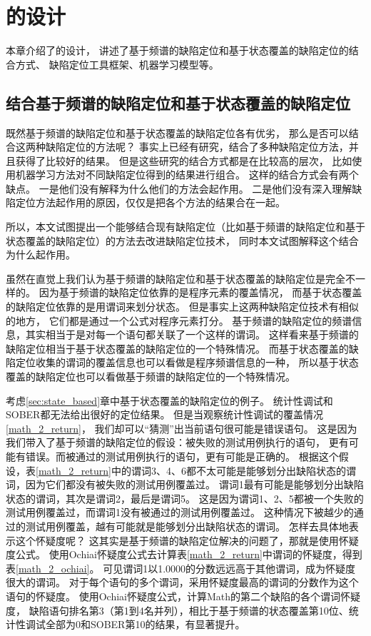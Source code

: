 \chapter{\toolname{}的设计}

本章介绍了\toolname{}的设计，
讲述了基于频谱的缺陷定位和基于状态覆盖的缺陷定位的结合方式、
缺陷定位工具框架、机器学习模型等。

\section{结合基于频谱的缺陷定位和基于状态覆盖的缺陷定位}
\label{sec:approach_comb}

既然基于频谱的缺陷定位和基于状态覆盖的缺陷定位各有优劣，
那么是否可以结合这两种缺陷定位的方法呢？
事实上已经有研究\parencite{Le2016A,Xuan2014Learning}，结合了多种缺陷定位方法，并且获得了比较好的结果。
但是这些研究的结合方式都是在比较高的层次，
比如使用机器学习方法对不同缺陷定位得到的结果进行组合。
这样的结合方式会有两个缺点。
一是他们没有解释为什么他们的方法会起作用。
二是他们没有深入理解缺陷定位方法起作用的原因，仅仅是把各个方法的结果合在一起。

所以，本文试图提出一个能够结合现有缺陷定位（比如基于频谱的缺陷定位和基于状态覆盖的缺陷定位）的方法去改进缺陷定位技术，
同时本文试图解释这个结合为什么起作用。

虽然在直觉上我们认为基于频谱的缺陷定位和基于状态覆盖的缺陷定位是完全不一样的。
因为基于频谱的缺陷定位依靠的是程序元素的覆盖情况，
而基于状态覆盖的缺陷定位依靠的是用谓词来划分状态。
但是事实上这两种缺陷定位技术有相似的地方，
它们都是通过一个公式对程序元素打分。
基于频谱的缺陷定位的频谱信息，其实相当于是对每一个语句都关联了一个这样的谓词。
这样看来基于频谱的缺陷定位相当于基于状态覆盖的缺陷定位的一个特殊情况。
而基于状态覆盖的缺陷定位收集的谓词的覆盖信息也可以看做是程序频谱信息的一种，
所以基于状态覆盖的缺陷定位也可以看做基于频谱的缺陷定位的一个特殊情况。

考虑\ref{sec:state_based}章中基于状态覆盖的缺陷定位的例子。
统计性调试和SOBER都无法给出很好的定位结果。
但是当观察统计性调试的覆盖情况\ref{math_2_return}，
我们却可以“猜测”出当前语句很可能是错误语句。
这是因为我们带入了基于频谱的缺陷定位的假设：被失败的测试用例执行的语句，
更有可能有错误。而被通过的测试用例执行的语句，更有可能是正确的。
根据这个假设，表\ref{math_2_return}中的谓词3、4、6都不太可能是能够划分出缺陷状态的谓词，因为它们都没有被失败的测试用例覆盖过。
谓词1最有可能是能够划分出缺陷状态的谓词，其次是谓词2，最后是谓词5。
这是因为谓词1、2、5都被一个失败的测试用例覆盖过，而谓词1没有被通过的测试用例覆盖过。
这种情况下被越少的通过的测试用例覆盖，越有可能就是能够划分出缺陷状态的谓词。
怎样去具体地表示这个怀疑度呢？
这其实是基于频谱的缺陷定位解决的问题了，那就是使用怀疑度公式。
使用Ochiai怀疑度公式去计算表\ref{math_2_return}中谓词的怀疑度，得到表\ref{math_2_ochiai}。
可见谓词1以1.0000的分数远远高于其他谓词，成为怀疑度很大的谓词。
对于每个语句的多个谓词，采用怀疑度最高的谓词的分数作为这个语句的怀疑度。
使用Ochiai怀疑度公式，计算Math的第二个缺陷的各个谓词怀疑度，
缺陷语句排名第3（第1到4名并列），相比于基于频谱的状态覆盖第10位、统计性调试全部为0和SOBER第10的结果，有显著提升。

